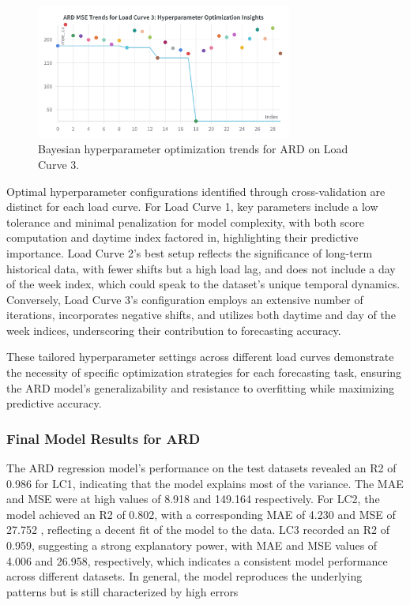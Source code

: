 \documentclass{article} %
\begin{document}
\begin{figure}[H]
    \centering
    \includegraphics[width=0.75\textwidth]{ressources/Hyperparams/ard/ARD MSE Trends for Load Curve 3 Hyperparameter Optimization Insights.png}
    \caption{Bayesian hyperparameter optimization trends for ARD on Load Curve 3.}
    \label{fig:ard_lc3}
\end{figure}
Optimal hyperparameter configurations identified through cross-validation are distinct for each load curve. For Load Curve 1, key parameters include a low tolerance and minimal penalization for model complexity, with both score computation and daytime index factored in, highlighting their predictive importance. Load Curve 2's best setup reflects the significance of long-term historical data, with fewer shifts but a high load lag, and does not include a day of the week index, which could speak to the dataset's unique temporal dynamics. Conversely, Load Curve 3's configuration employs an extensive number of iterations, incorporates negative shifts, and utilizes both daytime and day of the week indices, underscoring their contribution to forecasting accuracy.

These tailored hyperparameter settings across different load curves demonstrate the necessity of specific optimization strategies for each forecasting task, ensuring the \gls{ARD} model's generalizability and resistance to overfitting while maximizing predictive accuracy.

\subsubsection{Final Model Results for ARD}

The \acrshort{ARD} regression model's performance on the test datasets revealed an \acrshort{R2} of 0.986 for \acrshort{LC1}, indicating that the model explains most of the variance. The \acrshort{MAE} and \acrshort{MSE} were at high values of 8.918 and 149.164  respectively. For \acrshort{LC2}, the model achieved an \acrshort{R2} of 0.802, with a corresponding \acrshort{MAE} of 4.230 and \acrshort{MSE} of 27.752 , reflecting a decent fit of the model to the data. \acrshort{LC3} recorded an \acrshort{R2} of 0.959, suggesting a strong explanatory power, with \acrshort{MAE} and \acrshort{MSE} values of 4.006 and 26.958, respectively, which indicates a consistent model performance across different datasets. In general, the model reproduces the underlying patterns but is still characterized by high errors
\end{document}
